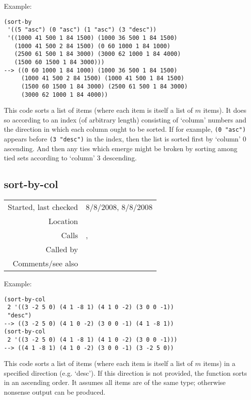 \vspace{0.5cm}
\noindent Example:
\begin{verbatim}
(sort-by
 '((5 "asc") (0 "asc") (1 "asc") (3 "desc"))
 '((1000 41 500 1 84 1500) (1000 36 500 1 84 1500)
   (1000 41 500 2 84 1500) (0 60 1000 1 84 1000)
   (2500 61 500 1 84 3000) (3000 62 1000 1 84 4000)
   (1500 60 1500 1 84 3000)))
--> ((0 60 1000 1 84 1000) (1000 36 500 1 84 1500)
     (1000 41 500 2 84 1500) (1000 41 500 1 84 1500)
     (1500 60 1500 1 84 3000) (2500 61 500 1 84 3000)
     (3000 62 1000 1 84 4000))
\end{verbatim}

\noindent This code sorts a list of items (where each
item is itself a list of $m$ items). It does so
according to an index (of arbitrary length) consisting
of `column' numbers and the direction in which each
column ought to be sorted. If for example,
\texttt{(0 "asc")} appears before \texttt{(3 "desc")}
in the index, then the list is sorted first by
`column' 0 ascending. And then any ties which emerge
might be broken by sorting among tied sets according
to `column' 3 descending.


\subsection*{sort-by-col}\label{fun:sort-by-col}

\vspace{0.3cm}
\begin{tabular}{r|p{8cm}}
Started, last checked & 8/8/2008, 8/8/2008 \\
Location & \nameref{sec:sort-by} \\
Calls & \nameref{fun:sort-by-col-asc}, \nameref{fun:sort-by-col-desc} \\
Called by & \nameref{fun:break-fixed-with-sort-by-col} \\
Comments/see also &
\end{tabular}

\vspace{0.5cm}
\noindent Example:
\begin{verbatim}
(sort-by-col
 2 '((3 -2 5 0) (4 1 -8 1) (4 1 0 -2) (3 0 0 -1))
 "desc")
--> ((3 -2 5 0) (4 1 0 -2) (3 0 0 -1) (4 1 -8 1))
(sort-by-col
 2 '((3 -2 5 0) (4 1 -8 1) (4 1 0 -2) (3 0 0 -1)))
--> ((4 1 -8 1) (4 1 0 -2) (3 0 0 -1) (3 -2 5 0))
\end{verbatim}

\noindent This code sorts a list of items (where each
item is itself a list of $m$ items) in a specified
direction (e.g. `desc'). If this direction is not
provided, the function sorts in an ascending order.
It assumes all items are of the same type; otherwise
nonsense output can be produced.


